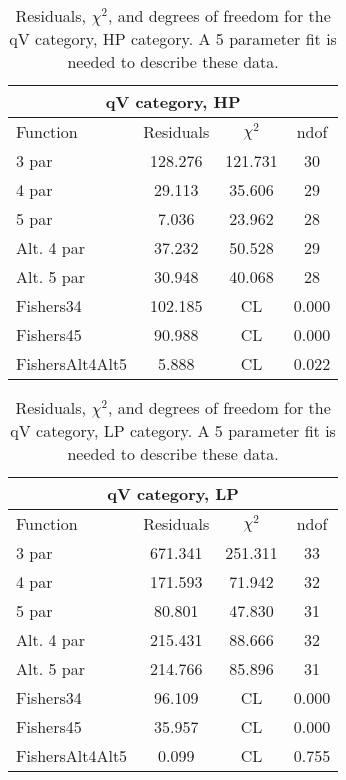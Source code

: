 \begin{table}[htb]
\centering
\begin{tabular}{|l c c c |}
\hline
\multicolumn{4}{|c|}{qV category, HP}\\
\hline
Function & Residuals & $\chi^2$ & ndof \\
\hline
3 par & 128.276 & 121.731 & 30 \\
4 par & 29.113 & 35.606 & 29 \\
5 par & 7.036 & 23.962 & 28 \\
Alt. 4 par& 37.232 & 50.528 & 29 \\
Alt. 5 par& 30.948 & 40.068 & 28 \\
\hline
\hline
Fishers34  & 102.185 & CL & 0.000\\
Fishers45  & 90.988 & CL & 0.000\\
FishersAlt4Alt5  & 5.888 & CL & 0.022\\
\hline
\end{tabular}
\caption{Residuals, $\chi^{2}$, and degrees of freedom for the qV category, HP category. A 5 parameter fit is needed to describe these data.}
\label{tab:qV category, HP}
\end{table}
\begin{table}[htb]
\centering
\begin{tabular}{|l c c c |}
\hline
\multicolumn{4}{|c|}{qV category, LP}\\
\hline
Function & Residuals & $\chi^2$ & ndof \\
\hline
3 par & 671.341 & 251.311 & 33 \\
4 par & 171.593 & 71.942 & 32 \\
5 par & 80.801 & 47.830 & 31 \\
Alt. 4 par& 215.431 & 88.666 & 32 \\
Alt. 5 par& 214.766 & 85.896 & 31 \\
\hline
\hline
Fishers34  & 96.109 & CL & 0.000\\
Fishers45  & 35.957 & CL & 0.000\\
FishersAlt4Alt5  & 0.099 & CL & 0.755\\
\hline
\end{tabular}
\caption{Residuals, $\chi^{2}$, and degrees of freedom for the qV category, LP category. A 5 parameter fit is needed to describe these data.}
\label{tab:qV category, LP}
\end{table}
